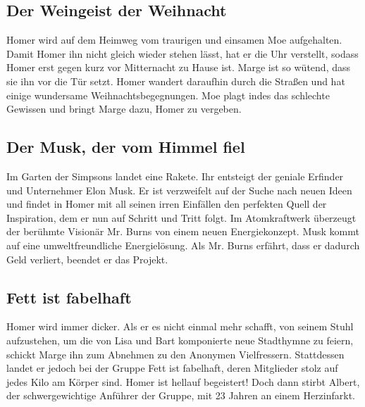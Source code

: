
\subsection{Der Weingeist der Weihnacht}\label{TABF03}
Homer wird auf dem Heimweg vom traurigen und einsamen Moe aufgehalten. Damit Homer ihn nicht gleich wieder stehen lässt, hat er die Uhr verstellt, sodass Homer erst gegen kurz vor Mitternacht zu Hause ist. Marge ist so wütend, dass sie ihn vor die Tür setzt. Homer wandert daraufhin durch die Straßen und hat einige wundersame Weihnachtsbegegnungen. Moe plagt indes das schlechte Gewissen und bringt Marge dazu, Homer zu vergeben.


\subsection{Der Musk, der vom Himmel fiel}
Im Garten der Simpsons landet eine Rakete. Ihr entsteigt der geniale Erfinder und Unternehmer Elon Musk. Er ist verzweifelt auf der Suche nach neuen Ideen und findet in Homer mit all seinen irren Einfällen den perfekten Quell der Inspiration, dem er nun auf Schritt und Tritt folgt. Im Atomkraftwerk überzeugt der berühmte Visionär Mr. Burns von einem neuen Energiekonzept. Musk kommt auf eine umweltfreundliche Energielösung. Als Mr. Burns erfährt, dass er dadurch Geld verliert, beendet er das Projekt.


\subsection{Fett ist fabelhaft}\label{TABF06}
Homer wird immer dicker. Als er es nicht einmal mehr schafft, von seinem Stuhl aufzustehen, um die von Lisa und Bart komponierte neue Stadthymne zu feiern, schickt Marge ihn zum Abnehmen zu den Anonymen Vielfressern. Stattdessen landet er jedoch bei der Gruppe \glqq Fett ist fabelhaft\grqq , deren Mitglieder stolz auf jedes Kilo am Körper sind. Homer ist hellauf begeistert! Doch dann stirbt Albert, der schwergewichtige Anführer der Gruppe, mit 23 Jahren an einem Herzinfarkt.

